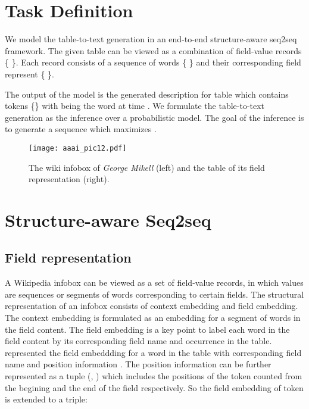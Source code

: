 \documentclass[letterpaper]{article} \usepackage{aaai18}  \usepackage{times}  \usepackage{helvet}  \usepackage{courier}  \usepackage{url}  \usepackage{graphicx}  \frenchspacing  \setlength{\pdfpagewidth}{8.5in}  \setlength{\pdfpageheight}{11in}  \usepackage{amsmath}
\begin{document}
\section{Task Definition}



We model the table-to-text generation in an end-to-end structure-aware seq2seq framework. The given table  can be viewed as a combination of  field-value records \{ \}. Each record  consists of a sequence of words \{ \} and their corresponding field represent \{ \}.

The output of the model is the generated description  for table  which contains  tokens \{\} with  being the word at time . We formulate the table-to-text generation as the inference over a probabilistic model.
The goal of the inference is to generate a sequence  which maximizes .  



\begin{figure}[]
\centering
\texttt{[image: aaai\_pic12.pdf]}
\caption{The wiki infobox of \textit{George Mikell} (left) and the table of its field representation (right).}\label{table2}
\end{figure} 

\section{Structure-aware Seq2seq}


\subsection{Field representation}
A Wikipedia infobox can be viewed as a set of field-value records, in which values are sequences or segments of words corresponding to certain fields.
The structural representation of an infobox consists of context embedding and field embedding. 
The context embedding is formulated as an embedding for a segment of words in the field content. 
The field embedding is a key point to label each word in the field content by its corresponding field name and occurrence in the table.  
\citeauthor{lebret2016neural}  represented the field embeddding  for a word  in the table with corresponding field name  and position information . 
The position information can be further represented as a tuple (, ) which includes the positions of the token  counted from the begining and the end of the field respectively. So the field embedding of token  is extended to a triple:
\end{document}
